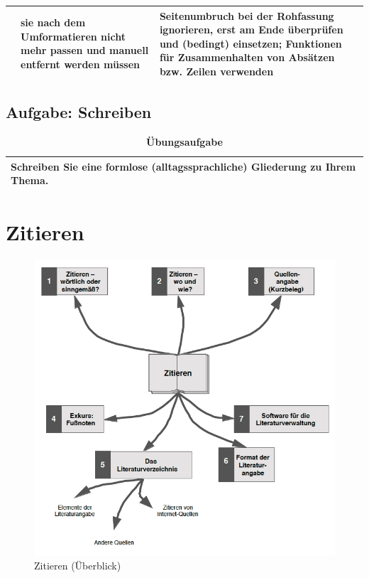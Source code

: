 \documentclass[]{book}
\theoremstyle{definition}
\theoremstyle{definition}
\theoremstyle{definition}
\theoremstyle{remark}
\begin{document}
\begin{longtable}[]{@{}lll@{}}
\begin{minipage}[t]{0.13\columnwidth}
\end{minipage} & \begin{minipage}[t]{0.41\columnwidth}\raggedright\strut
sie nach dem Umformatieren nicht mehr passen und manuell entfernt werden
müssen\strut
\end{minipage} & \begin{minipage}[t]{0.38\columnwidth}\raggedright\strut
Seitenumbruch bei der Rohfassung ignorieren, erst am Ende überprüfen und
(bedingt) einsetzen; Funktionen für Zusammenhalten von Absätzen bzw.
Zeilen verwenden\strut
\end{minipage}\tabularnewline
\bottomrule
\end{longtable}

\section{Aufgabe: Schreiben}\label{aufgabe-schreiben}

\begin{longtable}[]{@{}l@{}}
\caption{\textbf{\label{tab:aufgabe6-test} Übungsaufgabe}}\tabularnewline
\toprule
\begin{minipage}[t]{0.97\columnwidth}\raggedright\strut
Schreiben Sie eine formlose (alltagssprachliche) Gliederung zu Ihrem
Thema.\strut
\end{minipage}\tabularnewline
\bottomrule
\end{longtable}

\chapter{Zitieren}\label{zitieren}

\begin{figure}

{\centering \includegraphics{images/zitieren-min} 

}

\caption{Zitieren (Überblick)}\label{fig:unnamed-chunk-22}
\end{figure}
\end{document}
